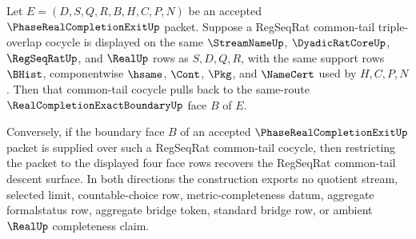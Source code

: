 \begin{theorem}
\label{thm:phase-real-completion-exit-regseqrat-common-tail-pullback}
Let $E=(D,S,Q,R,B,H,C,P,N)$ be an accepted $\PhaseRealCompletionExitUp$ packet. Suppose a RegSeqRat common-tail triple-overlap cocycle is displayed on the same $\StreamNameUp$, $\DyadicRatCoreUp$, $\RegSeqRatUp$, and $\RealUp$ rows as $S,D,Q,R$, with the same support rows $\BHist$, componentwise $\hsame$, $\Cont$, $\Pkg$, and $\NameCert$ used by $H,C,P,N$. Then that common-tail cocycle pulls back to the same-route $\RealCompletionExactBoundaryUp$ face $B$ of $E$.

Conversely, if the boundary face $B$ of an accepted $\PhaseRealCompletionExitUp$ packet is supplied over such a RegSeqRat common-tail cocycle, then restricting the packet to the displayed four face rows recovers the RegSeqRat common-tail descent surface. In both directions the construction exports no quotient stream, selected limit, countable-choice row, metric-completeness datum, aggregate formalstatus row, aggregate bridge token, standard bridge row, or ambient $\RealUp$ completeness claim.
\end{theorem}
